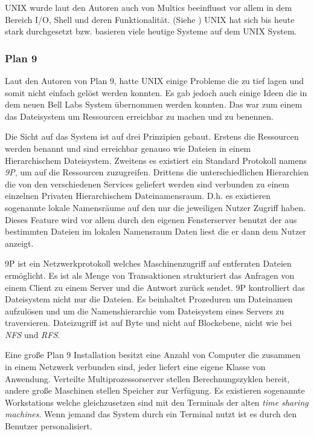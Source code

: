 \documentclass[11pt,technote]{IEEEtran}
\begin{document}
		    UNIX wurde laut den Autoren auch von Multics beeinflusst vor allem in dem Bereich I/O, Shell und deren Funktionalit\"at. (Siehe \cite[S. 374]{inproc:unix})
		    UNIX hat sich bis heute stark durchgesetzt bzw. basieren viele heutige Systeme auf dem UNIX System.
	    \subsubsection{Plan 9} \label{sec:secure:access:plan9}
        Laut den Autoren von Plan 9, hatte UNIX einige Probleme die zu tief lagen und somit nicht einfach gel\"ost werden konnten.
        Es gab jedoch auch einige Ideen die in dem neuen Bell Labs System \"ubernommen werden konnten.
        Das war zum einem das Dateisystem um Ressourcen erreichbar zu machen und zu benennen.
    
        Die Sicht auf das System ist auf drei Prinzipien gebaut.
        Erstens die Ressourcen werden benannt und sind erreichbar genauso wie Dateien in einem Hierarchischem Dateisystem. 
        Zweitens es existiert ein Standard Protokoll namens \textit{9P}, um auf die 
        Ressourcen zuzugreifen. Drittens die unterschiedlichen Hierarchien die von den verschiedenen Services geliefert
        werden sind verbunden zu einem einzelnen Privaten Hierarchischem Dateinamensraum. 
        D.h. es existieren sogenannte lokale Namensr\"aume auf den nur die jeweiligen Nutzer Zugriff haben.
        Dieses Feature wird vor allem durch den eigenen Fensterserver benutzt der aus bestimmten Dateien im lokalen 
        Namensraum Daten liest die er dann dem Nutzer anzeigt.
        
        9P ist ein Netzwerkprotokoll welches Maschinenzugriff auf entfernten Dateien erm\"oglicht.
        Es ist als Menge von Transaktionen strukturiert das Anfragen von einem Client zu einem Server und die Antwort zur\"uck sendet.
        9P kontrolliert das Dateisystem nicht nur die Dateien. Es beinhaltet Prozeduren um Dateinamen aufzul\"osen und um die Namenshierarchie
        vom Dateisystem eines Servers zu traversieren.
        Dateizugriff ist auf Byte und nicht auf Blockebene, nicht wie bei \textit{NFS} und \textit{RFS}.
        
        Eine gro\ss e Plan 9 Installation besitzt eine Anzahl von Computer die zusammen in einem Netzwerk verbunden sind,
        jeder liefert eine eigene Klasse von Anwendung. Verteilte Multiprozessorserver stellen
        Berechnungszyklen bereit, andere gro\ss e Maschinen stellen Speicher zur Verf\"ugung. Es existieren sogenannte Workstations welche gleichzusetzen sind mit den 
        Terminals der alten \textit{time sharing machines}. Wenn jemand das System durch ein Terminal nutzt ist es durch den Benutzer personalisiert.
    
\end{document}
